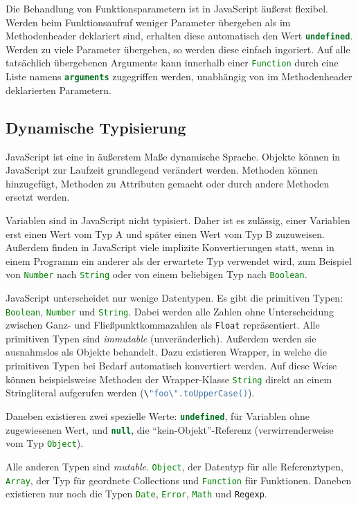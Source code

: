 \documentclass[a4paper, 12pt, hidelinks, listof=totoc, listoftables=totoc, bibliography=totoc]{scrreprt}
\newcommand{\js}[1]{\lstinline[language=JavaScript, style=inline]|#1|}
\begin{document}
Die Behandlung von Funktionsparametern ist in JavaScript äußerst flexibel. Werden beim Funktionsaufruf weniger Parameter übergeben als im Methodenheader deklariert sind, erhalten diese automatisch den Wert \js{undefined}. Werden zu viele Parameter übergeben, so werden diese einfach ingoriert. Auf alle tatsächlich übergebenen Argumente kann innerhalb einer \js{Function} durch eine Liste namens \js{arguments} zugegriffen werden, unabhängig von im Methodenheader deklarierten Parametern.

\subsection{Dynamische Typisierung}

JavaScript ist eine in äußerstem Maße dynamische Sprache. Objekte können in JavaScript zur Laufzeit grundlegend verändert werden. Methoden können hinzugefügt, Methoden zu Attributen gemacht oder durch andere Methoden ersetzt werden.

Variablen sind in JavaScript nicht typisiert. Daher ist es zulässig, einer Variablen erst einen Wert vom Typ A und später einen Wert vom Typ B zuzuweisen. Außerdem finden in JavaScript viele implizite Konvertierungen statt, wenn in einem Programm ein anderer als der erwartete Typ verwendet wird, zum Beispiel von \js{Number} nach \js{String} oder von einem beliebigen Typ nach \js{Boolean}.

JavaScript unterscheidet nur wenige Datentypen. Es gibt die primitiven Typen: \js{Boolean}, \js{Number} und \js{String}. 
Dabei werden alle Zahlen ohne Unterscheidung zwischen Ganz- und Fließpunktkommazahlen als \js{Float} repräsentiert. Alle primitiven Typen sind \emph{immutable} (unveränderlich). Außerdem werden sie ausnahmslos als Objekte behandelt. Dazu existieren Wrapper, in welche die primitiven Typen bei Bedarf automatisch konvertiert werden. Auf diese Weise können beispielsweise Methoden der Wrapper-Klasse \js{String} direkt an einem Stringliteral aufgerufen werden (\js{\"foo\".toUpperCase()}).

Daneben existieren zwei spezielle Werte: \js{undefined}, für Variablen ohne zugewiesenen Wert, und \js{null}, die "`kein-Objekt"'-Referenz (verwirrenderweise vom Typ \js{Object}).

Alle anderen Typen sind \emph{mutable}. \js{Object}, der Datentyp für alle Referenztypen, \js{Array}, der Typ für geordnete Collections und \js{Function} für Funktionen. Daneben existieren nur noch die Typen \js{Date}, \js{Error}, \js{Math} und \js{Regexp}. \cite[S. 29 ff.]{flanagan2011.JDG}
\end{document}
